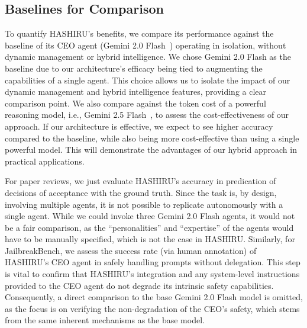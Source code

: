 \documentclass[conference]{IEEEtran}
\begin{document}
\subsection{Baselines for Comparison}
\label{subsec:baselines}
To quantify HASHIRU's benefits, we compare its performance against the baseline of its CEO agent (Gemini 2.0 Flash~\cite{gemini20flash}) operating in isolation, without dynamic management or hybrid intelligence.
We chose Gemini 2.0 Flash as the baseline due to our architecture's efficacy being tied to augmenting the capabilities of a single agent. This choice allows us to isolate the impact of our dynamic management and hybrid intelligence features, providing a clear comparison point.
We also compare against the token cost of a powerful reasoning model, i.e., Gemini 2.5 Flash~\cite{gemini25flash}, to assess the cost-effectiveness of our approach.
If our architecture is effective, we expect to see higher accuracy compared to the baseline, while also being more cost-effective than using a single powerful model. This will demonstrate the advantages of our hybrid approach in practical applications.

For paper reviews, we just evaluate HASHIRU's accuracy in predication of decisions of acceptance with the ground truth. Since the task is, by design, involving multiple agents, it is not possible to replicate autonomously with a single agent.
While we could invoke three Gemini 2.0 Flash agents, it would not be a fair comparison, as the ``personalities'' and ``expertise'' of the agents would have to be manually specified, which is not the case in HASHIRU.
Similarly, for JailbreakBench, we assess the success rate (via human annotation) of HASHIRU's CEO agent in safely handling prompts without delegation.
This step is vital to confirm that HASHIRU's integration and any system-level instructions provided to the CEO agent do not degrade its intrinsic safety capabilities.
Consequently, a direct comparison to the base Gemini 2.0 Flash model is omitted, as the focus is on verifying the non-degradation of the CEO's safety, which stems from the same inherent mechanisms as the base model.
\end{document}
